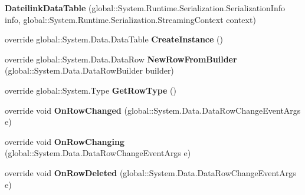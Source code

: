 \begin{DoxyCompactItemize}
\item 
{\bfseries Dateilink\+Data\+Table} (global\+::\+System.\+Runtime.\+Serialization.\+Serialization\+Info info, global\+::\+System.\+Runtime.\+Serialization.\+Streaming\+Context context)\hypertarget{class_products_1_1_data_1_1ds_sage_1_1_dateilink_data_table_abd37bc3456ee87d7097906f0a0860f4f}{}\label{class_products_1_1_data_1_1ds_sage_1_1_dateilink_data_table_abd37bc3456ee87d7097906f0a0860f4f}

\item 
override global\+::\+System.\+Data.\+Data\+Table {\bfseries Create\+Instance} ()\hypertarget{class_products_1_1_data_1_1ds_sage_1_1_dateilink_data_table_a45be7d6421b1d43b1236a36abba68fd3}{}\label{class_products_1_1_data_1_1ds_sage_1_1_dateilink_data_table_a45be7d6421b1d43b1236a36abba68fd3}

\item 
override global\+::\+System.\+Data.\+Data\+Row {\bfseries New\+Row\+From\+Builder} (global\+::\+System.\+Data.\+Data\+Row\+Builder builder)\hypertarget{class_products_1_1_data_1_1ds_sage_1_1_dateilink_data_table_aab5c397dcf160bdcbe44de3e00a0833e}{}\label{class_products_1_1_data_1_1ds_sage_1_1_dateilink_data_table_aab5c397dcf160bdcbe44de3e00a0833e}

\item 
override global\+::\+System.\+Type {\bfseries Get\+Row\+Type} ()\hypertarget{class_products_1_1_data_1_1ds_sage_1_1_dateilink_data_table_a5024231563778a3fa4ef9978fff3f8bb}{}\label{class_products_1_1_data_1_1ds_sage_1_1_dateilink_data_table_a5024231563778a3fa4ef9978fff3f8bb}

\item 
override void {\bfseries On\+Row\+Changed} (global\+::\+System.\+Data.\+Data\+Row\+Change\+Event\+Args e)\hypertarget{class_products_1_1_data_1_1ds_sage_1_1_dateilink_data_table_aac4c8c42916d11a78ad3cf6eaf67c99f}{}\label{class_products_1_1_data_1_1ds_sage_1_1_dateilink_data_table_aac4c8c42916d11a78ad3cf6eaf67c99f}

\item 
override void {\bfseries On\+Row\+Changing} (global\+::\+System.\+Data.\+Data\+Row\+Change\+Event\+Args e)\hypertarget{class_products_1_1_data_1_1ds_sage_1_1_dateilink_data_table_a41594fadd981871162758cce048fc4dd}{}\label{class_products_1_1_data_1_1ds_sage_1_1_dateilink_data_table_a41594fadd981871162758cce048fc4dd}

\item 
override void {\bfseries On\+Row\+Deleted} (global\+::\+System.\+Data.\+Data\+Row\+Change\+Event\+Args e)\hypertarget{class_products_1_1_data_1_1ds_sage_1_1_dateilink_data_table_a69a9025bf8f7ca7f1f5d0826c8fa3443}{}\label{class_products_1_1_data_1_1ds_sage_1_1_dateilink_data_table_a69a9025bf8f7ca7f1f5d0826c8fa3443}


\end{DoxyCompactItemize}
